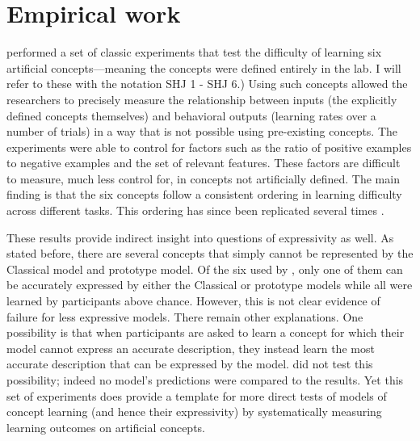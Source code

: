 \documentclass[doc,floatsintext]{apa6}
\begin{document}

\section{Empirical work}


\citet{shepardhj1961} performed a set of classic experiments that test the difficulty of learning six artificial concepts---meaning the concepts were defined entirely in the lab. I will refer to these with the notation SHJ 1 - SHJ 6.) Using such concepts allowed the researchers to precisely measure the relationship between inputs (the explicitly defined concepts themselves) and behavioral outputs (learning rates over a number of trials) in a way that is not possible using pre-existing concepts. The experiments were able to control for factors such as the ratio of positive examples to negative examples and the set of relevant features. These factors are difficult to measure, much less control for, in concepts not artificially defined. The main finding is that the six concepts follow a consistent ordering in learning difficulty across different tasks. This ordering has since been replicated several times \citep[e.g.][]{feldman2000,kempr2012,crump2013}.

These results provide indirect insight into questions of expressivity as well. As stated before, there are several concepts that simply cannot be represented by the Classical model and prototype model. Of the six used by \citet{shepardhj1961}, only one of them can be accurately expressed by either the Classical or prototype models while
all were learned by participants above chance. However, this is not clear evidence of failure for less expressive models. There remain other explanations. One possibility is that when participants are asked to learn a concept for which their model cannot express an accurate description, they instead learn the most accurate description that can be expressed by the model. \citeauthor{shepardhj1961} did not test this possibility; indeed no model's predictions were compared to the results. Yet this set of experiments does provide a template for more direct tests of models of concept learning (and hence their expressivity) by systematically measuring learning outcomes on artificial concepts.
\end{document}
